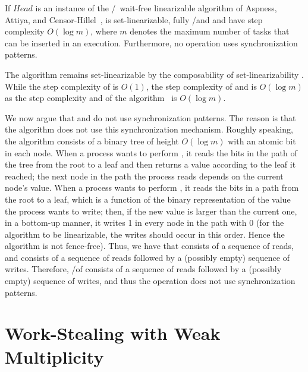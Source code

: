 \begin{theorem}\label{theo-wf-log}
If $Head$ is an instance of the \R/\W\ wait-free linearizable \MaxReg algorithm of Aspness, Attiya, and Censor-Hillel~\cite{DBLP_journals_jacm_AspnesAC12}, \WFWSM is set-linearizable, fully \R/\W and \Take and \Steal have step complexity $O(\log m)$, where $m$ denotes the maximum number of tasks that can be inserted in an execution.  Furthermore, no operation uses \RAW synchronization patterns.
\end{theorem}

\begin{thesisproof}
The algorithm remains set-linearizable by the composability of set-linearizability \cite{DBLP_journals_jacm_CastanedaRR18}. While the step complexity of \Put is $O(1)$, the step complexity of \Take and \Steal is $O(\log m)$ as the step complexity \MaxR and \MaxW of the \MaxReg algorithm~\cite{DBLP_journals_jacm_AspnesAC12} is $O(\log m)$.

We now argue that \Take and \Steal do not use \RAW synchronization patterns. The reason is that the \MaxReg algorithm does not use this synchronization mechanism. Roughly speaking, the algorithm consists of a binary tree of height $O(\log m)$ with an atomic bit in each node.  When a process wants to perform \MaxR, it reads the bits in the path of the tree from the root to a leaf and then returns a value according to the leaf it reached; the next node in the path the process reads depends on the current node's value. When a process wants to perform \MaxW, it reads the bits in a path from the root to a leaf, which is a function of the binary representation of the value the process wants to write; then, if the new value is larger than the current one, in a bottom-up manner, it writes 1 in every node in the path with 0 (for the algorithm to be linearizable, the writes should occur in this order. Hence the algorithm is not fence-free). Thus, we have that \MaxR consists of a sequence of reads, and \MaxW consists of a sequence of reads followed by a (possibly empty) sequence of writes. Therefore, \Take/\Steal of \WFWSM consists of a sequence of reads followed by a (possibly empty) sequence of writes, and thus the operation does not use \RAW synchronization patterns.
\end{thesisproof}

\section{\label{sec-ws-nc-mult}Work-Stealing with Weak Multiplicity}

